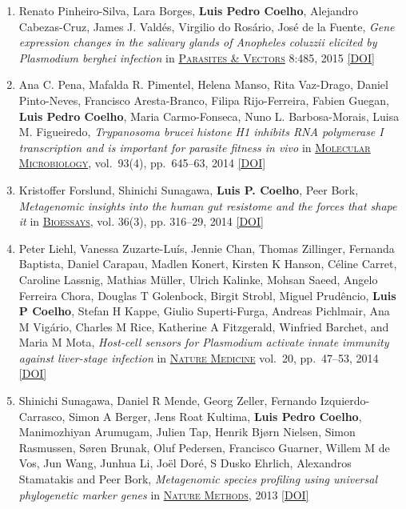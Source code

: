 \documentclass{article}
\newcommand\showdoi[1]{%
    \href{https://doi.org/#1}{[DOI]}%
}
\newcommand\pubname[1]{\textsc{\uline{#1}}}
\newcommand\contribution[1]{\relax}
\begin{document}
\begin{enumerate}[resume]
\item Renato Pinheiro-Silva, Lara Borges, \textbf{Luis Pedro Coelho}, Alejandro
Cabezas-Cruz, James J. Valdés, Virgilio do Rosário, José de la Fuente,
\emph{Gene expression changes in the salivary glands of Anopheles coluzzii
elicited by Plasmodium berghei infection} in \pubname{Parasites \& Vectors}
8:485, 2015 \showdoi{10.1186/s13071-015-1079-8}
\contribution{I supervised the first-author, who was, at the time a PhD
student, in the statistical analysis of the RNA-seq data.}


\item Ana C. Pena, Mafalda R. Pimentel, Helena Manso, Rita Vaz-Drago, Daniel
Pinto-Neves, Francisco Aresta-Branco, Filipa Rijo-Ferreira, Fabien Guegan,
\textbf{Luis Pedro Coelho}, Maria Carmo-Fonseca, Nuno L. Barbosa-Morais, Luisa
M. Figueiredo, \emph{Trypanosoma brucei histone H1 inhibits RNA polymerase I
transcription and is important for parasite fitness in vivo} in
\pubname{Molecular Microbiology}, vol.\ 93(4), pp.\ 645--63, 2014
\showdoi{10.1111/mmi.12677}
\contribution{I supervised D.P-N., who was at the time, a bioinformatics MSc
student, in the statistical analysis of the RNA-seq data.}

\item Kristoffer Forslund, Shinichi Sunagawa, \textbf{Luis P. Coelho}, Peer
Bork, \emph{Metagenomic insights into the human gut resistome and the forces that
shape it} in \pubname{Bioessays}, vol. 36(3), pp. 316--29, 2014
\showdoi{10.1002/bies.201300143}
\contribution{I performed data analysis.}

\item Peter Liehl, Vanessa Zuzarte-Luís, Jennie Chan, Thomas Zillinger,
Fernanda Baptista, Daniel Carapau, Madlen Konert, Kirsten K Hanson, Céline
Carret, Caroline Lassnig, Mathias Müller, Ulrich Kalinke, Mohsan Saeed,
Angelo Ferreira Chora, Douglas T Golenbock, Birgit Strobl, Miguel Prudêncio,
\textbf{Luis P Coelho}, Stefan H Kappe, Giulio Superti-Furga, Andreas
Pichlmair, Ana M Vigário, Charles M Rice, Katherine A Fitzgerald, Winfried
Barchet, and Maria M Mota, \emph{Host-cell sensors for Plasmodium activate
innate immunity against liver-stage infection} in \pubname{Nature Medicine}
vol.\ 20, pp.\ 47--53, 2014 \showdoi{10.1038/nm.3424}
\contribution{I performed statistical analysis of the gene expression data.}

\item Shinichi Sunagawa, Daniel R Mende, Georg Zeller, Fernando
Izquierdo-Carrasco, Simon A Berger, Jens Roat Kultima, \textbf{Luis Pedro
Coelho}, Manimozhiyan Arumugam, Julien Tap, Henrik Bjørn Nielsen, Simon
Rasmussen, Søren Brunak, Oluf Pedersen, Francisco Guarner, Willem M de Vos,
Jun Wang, Junhua Li, Joël Doré, S Dusko Ehrlich, Alexandros Stamatakis and
Peer Bork, \emph{Metagenomic species profiling using universal phylogenetic
marker genes} in \pubname{Nature Methods}, 2013 \showdoi{10.1038/nmeth.2693}
\contribution{I implemented the stand-alone version of the published metagenomics tool.}


\end{enumerate}
\end{document}
